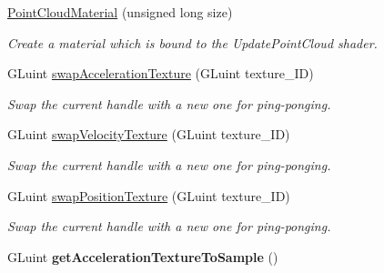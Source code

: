 \begin{DoxyCompactItemize}
\item 
\hypertarget{class_point_cloud_material_af492c996c142a7e4de594f5b18066188}{\hyperlink{class_point_cloud_material_af492c996c142a7e4de594f5b18066188}{Point\-Cloud\-Material} (unsigned long size)}\label{class_point_cloud_material_af492c996c142a7e4de594f5b18066188}

\begin{DoxyCompactList}\small\item\em Create a material which is bound to the Update\-Point\-Cloud shader. \end{DoxyCompactList}\item 
\hypertarget{class_point_cloud_material_af0f65155c8351eed26eacd89ef0ba793}{G\-Luint \hyperlink{class_point_cloud_material_af0f65155c8351eed26eacd89ef0ba793}{swap\-Acceleration\-Texture} (G\-Luint texture\-\_\-\-I\-D)}\label{class_point_cloud_material_af0f65155c8351eed26eacd89ef0ba793}

\begin{DoxyCompactList}\small\item\em Swap the current handle with a new one for ping-\/ponging. \end{DoxyCompactList}\item 
\hypertarget{class_point_cloud_material_afe68685679a4d3987b696da05b10e6aa}{G\-Luint \hyperlink{class_point_cloud_material_afe68685679a4d3987b696da05b10e6aa}{swap\-Velocity\-Texture} (G\-Luint texture\-\_\-\-I\-D)}\label{class_point_cloud_material_afe68685679a4d3987b696da05b10e6aa}

\begin{DoxyCompactList}\small\item\em Swap the current handle with a new one for ping-\/ponging. \end{DoxyCompactList}\item 
\hypertarget{class_point_cloud_material_a94b68dd13e9310757befdc869c326003}{G\-Luint \hyperlink{class_point_cloud_material_a94b68dd13e9310757befdc869c326003}{swap\-Position\-Texture} (G\-Luint texture\-\_\-\-I\-D)}\label{class_point_cloud_material_a94b68dd13e9310757befdc869c326003}

\begin{DoxyCompactList}\small\item\em Swap the current handle with a new one for ping-\/ponging. \end{DoxyCompactList}\item 
\hypertarget{class_point_cloud_material_a24f184c939c6bab4055376b3e99ffac6}{G\-Luint {\bfseries get\-Acceleration\-Texture\-To\-Sample} ()}\label{class_point_cloud_material_a24f184c939c6bab4055376b3e99ffac6}


\end{DoxyCompactItemize}
